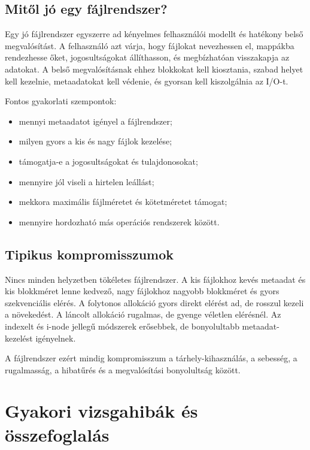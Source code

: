 \subsection{Mitől jó egy fájlrendszer?}

Egy jó fájlrendszer egyszerre ad kényelmes felhasználói modellt és hatékony belső megvalósítást. A felhasználó azt várja, hogy fájlokat nevezhessen el, mappákba rendezhesse őket, jogosultságokat állíthasson, és megbízhatóan visszakapja az adatokat. A belső megvalósításnak ehhez blokkokat kell kiosztania, szabad helyet kell kezelnie, metaadatokat kell védenie, és gyorsan kell kiszolgálnia az I/O-t.

Fontos gyakorlati szempontok:

\begin{itemize}
  \item mennyi metaadatot igényel a fájlrendszer;
  \item milyen gyors a kis és nagy fájlok kezelése;
  \item támogatja-e a jogosultságokat és tulajdonosokat;
  \item mennyire jól viseli a hirtelen leállást;
  \item mekkora maximális fájlméretet és kötetméretet támogat;
  \item mennyire hordozható más operációs rendszerek között.
\end{itemize}

\subsection{Tipikus kompromisszumok}

Nincs minden helyzetben tökéletes fájlrendszer. A kis fájlokhoz kevés metaadat és kis blokkméret lenne kedvező, nagy fájlokhoz nagyobb blokkméret és gyors szekvenciális elérés. A folytonos allokáció gyors direkt elérést ad, de rosszul kezeli a növekedést. A láncolt allokáció rugalmas, de gyenge véletlen elérésnél. Az indexelt és i-node jellegű módszerek erősebbek, de bonyolultabb metaadat-kezelést igényelnek.

A fájlrendszer ezért mindig kompromisszum a tárhely-kihasználás, a sebesség, a rugalmasság, a hibatűrés és a megvalósítási bonyolultság között.

\section{Gyakori vizsgahibák és összefoglalás}

